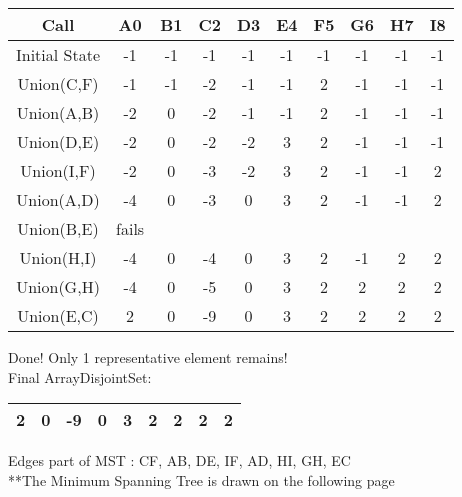\documentclass[12pt,a4paper]{article}
\begin{document}
\begin{tabular}{|c|c|c|c|c|c|c|c|c|c|}
\hline
Call & A0 & B1 & C2 & D3 & E4 & F5 & G6 & H7 & I8 \\
\hline
Initial State & -1 & -1 &-1 & -1 & -1 & -1 & -1 & -1 & -1 \\
\hline
Union(C,F) & -1 & -1 &-2 & -1 & -1 & 2 & -1 & -1 & -1 \\
\hline
Union(A,B) & -2 & 0 &-2 & -1 & -1 & 2 & -1 & -1 & -1 \\
\hline
Union(D,E) & -2 & 0 &-2 & -2 & 3 & 2 & -1 & -1 & -1 \\
\hline
Union(I,F) & -2 & 0 &-3 & -2 & 3 & 2 & -1 & -1 & 2 \\
\hline
Union(A,D) & -4 & 0 &-3 & 0 & 3 & 2 & -1 & -1 & 2 \\
\hline
Union(B,E) & fails\\
\hline
Union(H,I) & -4 & 0 &-4 & 0 & 3 & 2 & -1 & 2 & 2 \\
\hline
Union(G,H) & -4 & 0 &-5 & 0 & 3 & 2 & 2 & 2 & 2 \\
\hline
Union(E,C) & 2 & 0 &-9 & 0 & 3 & 2 & 2 & 2 & 2 \\
\hline

\end{tabular}
\vskip 0.2in
Done! Only 1 representative element remains!\\

Final ArrayDisjointSet: 
\begin{tabular}{|c|c|c|c|c|c|c|c|c|}
\hline
2 & 0 &-9 & 0 & 3 & 2 & 2 & 2 & 2\\
\hline
\end{tabular}

\vskip 0.5in
Edges part of MST : CF, AB, DE, IF, AD, HI, GH, EC\\
**The Minimum Spanning Tree is drawn on the following page
\end{document}
